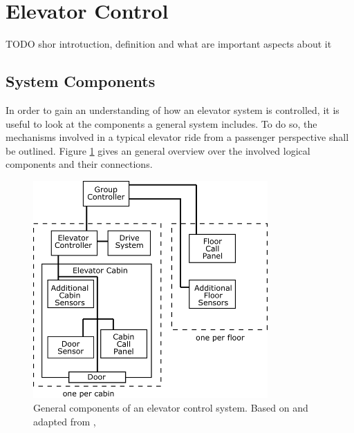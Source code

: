 \section{Elevator Control}
TODO shor introtuction, definition and what are important aspects about it

\subsection{System Components}

In order to gain an understanding of how an elevator system is controlled,
it is useful to look at the components a general system includes.
To do so, the mechanisms involved in a typical elevator ride 
from a passenger perspective shall be outlined.
Figure \ref{fig:sota:systemcomponents} gives an general overview over the involved logical components and their connections.

\begin{figure}[hbt]
	\centering
	\includegraphics[width=0.8\textwidth, keepaspectratio]{resources/systemcomponets}
	\caption{\label{fig:sota:systemcomponents} General components of an elevator control system. Based on and adapted from \textcite[][pp.~4,16]{xang2016trafficlist},  \textcite[][pp.10]{siikonen1997models}}
\end{figure}

